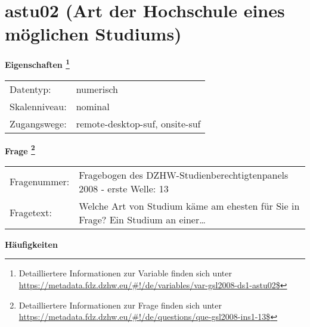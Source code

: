 
    \setcounter{footnote}{0}

    \vspace*{-1.8cm}
	\section{astu02 (Art der Hochschule eines möglichen Studiums)}
	\label{section:astu02}



    \vspace*{0.5cm}
    \noindent\textbf{Eigenschaften
	\footnote{Detailliertere Informationen zur Variable finden sich unter
		\url{https://metadata.fdz.dzhw.eu/\#!/de/variables/var-gsl2008-ds1-astu02$}}}\\
	\begin{tabularx}{\hsize}{@{}lX}
	Datentyp: & numerisch \\
	Skalenniveau: & nominal \\
	Zugangswege: &
	  remote-desktop-suf, 
	  onsite-suf
 \\
    \end{tabularx}



				\vspace*{0.5cm}
                \noindent\textbf{Frage
	                \footnote{Detailliertere Informationen zur Frage finden sich unter
		              \url{https://metadata.fdz.dzhw.eu/\#!/de/questions/que-gsl2008-ins1-13$}}}\\
				\begin{tabularx}{\hsize}{@{}lX}
					Fragenummer: &
					  Fragebogen des DZHW-Studienberechtigtenpanels 2008 - erste Welle:
					  13
 \\
					Fragetext: & Welche Art von Studium käme am ehesten für Sie in Frage? Ein Studium an einer… \\
				\end{tabularx}





        		\vspace*{0.5cm}
                \noindent\textbf{Häufigkeiten}

